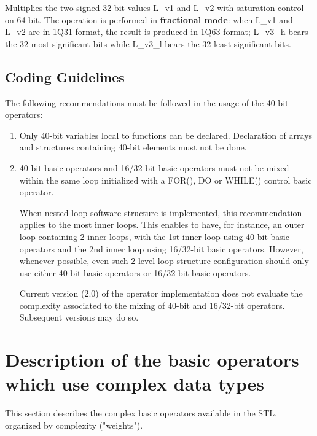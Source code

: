 
Multiplies the two signed 32-bit values L\_v1 and L\_v2 with saturation control on 64-bit.
The operation is performed in \textbf{fractional mode}: when L\_v1 and L\_v2 are in 1Q31 format, the result is produced in 1Q63 format; L\_v3\_h bears the 32 most significant bits while L\_v3\_l bears the 32 least significant bits.

\subsection{Coding Guidelines}

The following recommendations must be followed in the usage of the
40-bit operators:
\begin{enumerate}
    \item Only 40-bit variables local to functions can be declared.
    Declaration of arrays and structures containing 40-bit elements
    must not be done.
    \item 40-bit basic operators and 16/32-bit basic
    operators must not be mixed within the same loop initialized with
    a FOR(), DO or WHILE() control basic operator.

    When nested loop software structure is implemented, this
    recommendation applies to the most inner loops. This enables to
    have, for instance, an outer loop containing 2 inner loops, with
    the 1st inner loop using 40-bit basic operators and the 2nd inner
    loop using 16/32-bit basic operators. However, whenever possible,
    even such 2 level loop structure configuration should only use
    either 40-bit basic operators or 16/32-bit basic operators.

    Current version (2.0) of the operator implementation does not
    evaluate the complexity associated to the mixing of 40-bit and
    16/32-bit operators. Subsequent versions may do so.
\end{enumerate}

\section{Description of the basic operators which use complex data types }

This section describes the complex basic operators available in the STL, organized by complexity ("weights").

